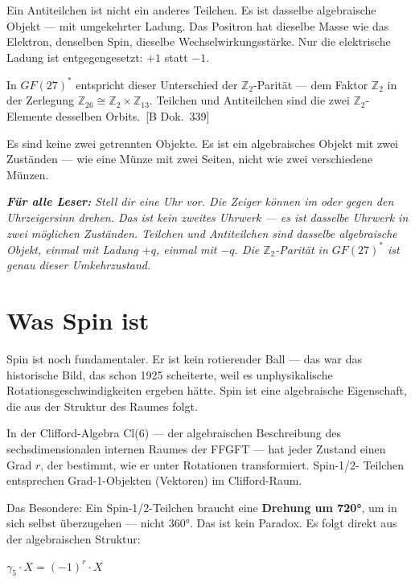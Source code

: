 \documentclass[11pt,oneside]{book}
\newcommand{\status}[1]{\penalty10000\,{\scriptsize\textcolor{gray!60}{[#1]}}}
\newenvironment{laierspur}{%
  \par\vspace{4pt}%
  \noindent\small\itshape\color{blue!60!black}%
  \textbf{Für alle Leser:}\enspace\ignorespaces}{%
  \par\vspace{4pt}\normalsize\normalfont\normalcolor}
\begin{document}
Ein Antiteilchen ist nicht ein anderes Teilchen. Es ist dasselbe
algebraische Objekt --- mit umgekehrter Ladung. Das Positron hat dieselbe
Masse wie das Elektron, denselben Spin, dieselbe Wechselwirkungsstärke.
Nur die elektrische Ladung ist entgegengesetzt: $+1$ statt $-1$.

In $GF(27)^*$ entspricht dieser Unterschied der $\mathbb{Z}_2$-Parität ---
dem Faktor $\mathbb{Z}_2$ in der Zerlegung $\mathbb{Z}_{26} \cong
\mathbb{Z}_2 \times \mathbb{Z}_{13}$. Teilchen und Antiteilchen sind
die zwei $\mathbb{Z}_2$-Elemente desselben Orbits. \status{B Dok.~339}

Es sind keine zwei getrennten Objekte. Es ist ein algebraisches Objekt
mit zwei Zuständen --- wie eine Münze mit zwei Seiten, nicht wie zwei
verschiedene Münzen.

\begin{laierspur}
Stell dir eine Uhr vor. Die Zeiger können im oder gegen den Uhrzeigersinn
drehen. Das ist kein zweites Uhrwerk --- es ist dasselbe Uhrwerk in zwei
möglichen Zuständen. Teilchen und Antiteilchen sind dasselbe algebraische
Objekt, einmal mit Ladung $+q$, einmal mit $-q$. Die $\mathbb{Z}_2$-Parität
in $GF(27)^*$ ist genau dieser Umkehrzustand.
\end{laierspur}

\section*{Was Spin ist}

Spin ist noch fundamentaler. Er ist kein rotierender Ball --- das war
das historische Bild, das schon 1925 scheiterte, weil es unphysikalische
Rotationsgeschwindigkeiten ergeben hätte. Spin ist eine algebraische
Eigenschaft, die aus der Struktur des Raumes folgt.

In der Clifford-Algebra Cl(6) --- der algebraischen Beschreibung des
sechsdimensionalen internen Raumes der FFGFT --- hat jeder Zustand einen
Grad $r$, der bestimmt, wie er unter Rotationen transformiert. Spin-1/2-
Teilchen entsprechen Grad-1-Objekten (Vektoren) im Clifford-Raum.

Das Besondere: Ein Spin-1/2-Teilchen braucht eine \textbf{Drehung um
720°}, um in sich selbst überzugehen --- nicht 360°. Das ist kein
Paradox. Es folgt direkt aus der algebraischen Struktur:

\begin{center}
$\gamma_5 \cdot X = (-1)^r \cdot X$
\end{center}
\end{document}

